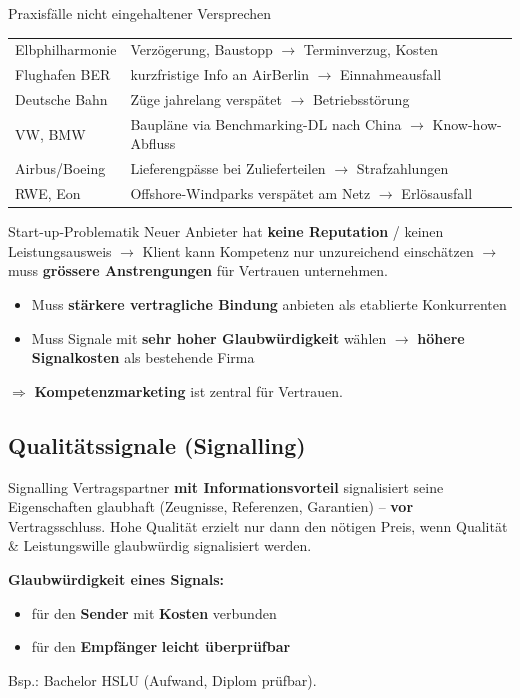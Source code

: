 \documentclass[a4paper, fontsize=7pt]{scrartcl}
\renewcommand*{\arraystretch}{1.5}  %
\begin{document}
\begin{subbox}{Praxisfälle nicht eingehaltener Versprechen}
\renewcommand*{\arraystretch}{1.15}
\begin{tabularx}{\linewidth}{@{}lX@{}}
Elbphilharmonie & Verzögerung, Baustopp $\to$ Terminverzug, Kosten \\
Flughafen BER & kurzfristige Info an AirBerlin $\to$ Einnahmeausfall \\
Deutsche Bahn & Züge jahrelang verspätet $\to$ Betriebsstörung \\
VW, BMW & Baupläne via Benchmarking-DL nach China
$\to$ Know-how-Abfluss \\
Airbus/Boeing & Lieferengpässe bei Zulieferteilen $\to$ Strafzahlungen \\
RWE, Eon & Offshore-Windparks verspätet am Netz $\to$ Erlösausfall \\
\end{tabularx}
\end{subbox}

\begin{mainbox}{Start-up-Problematik}
Neuer Anbieter hat \textbf{keine Reputation} / keinen Leistungsausweis
$\to$ Klient kann Kompetenz nur unzureichend einschätzen $\to$ muss
\textbf{grössere Anstrengungen} für Vertrauen unternehmen.
\begin{itemize}
    \item Muss \textbf{stärkere vertragliche Bindung} anbieten als
    etablierte Konkurrenten
    \item Muss Signale mit \textbf{sehr hoher Glaubwürdigkeit} wählen
    $\to$ \textbf{höhere Signalkosten} als bestehende Firma
\end{itemize}
$\Rightarrow$ \textbf{Kompetenzmarketing} ist zentral für Vertrauen.
\end{mainbox}

\subsection{Qualitätssignale (Signalling)}

\begin{mainbox}{Signalling}
Vertragspartner \textbf{mit Informationsvorteil} signalisiert seine
Eigenschaften glaubhaft (Zeugnisse, Referenzen, Garantien) --
\textbf{vor} Vertragsschluss. Hohe Qualität erzielt nur dann den nötigen
Preis, wenn Qualität \& Leistungswille glaubwürdig signalisiert werden.

\textbf{Glaubwürdigkeit eines Signals:}
\begin{itemize}
    \item für den \textbf{Sender} mit \textbf{Kosten} verbunden
    \item für den \textbf{Empfänger} \textbf{leicht überprüfbar}
\end{itemize}
Bsp.: Bachelor HSLU (Aufwand, Diplom prüfbar).
\end{mainbox}
\end{document}

